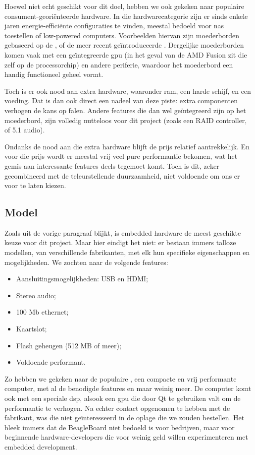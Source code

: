 \documentclass[verslag.tex]{subfiles}
\begin{document}
Hoewel niet echt geschikt voor dit doel, hebben we ook gekeken naar populaire consument-georiënteerde hardware. In die hardwarecategorie zijn er sinds enkele jaren energie-efficiënte configuraties te vinden, meestal bedoeld voor \ac{nas} toestellen of low-powered computers. Voorbeelden hiervan zijn moederborden gebaseerd op de , of de meer recent geïntroduceerde . Dergelijke moederborden komen vaak met een geïntegreerde \ac{gpu} (in het geval van de AMD Fusion zit die zelf op de processorchip) en andere periferie, waardoor het moederbord een handig functioneel geheel vormt.

Toch is er ook nood aan extra hardware, waaronder \ac{ram}, een harde schijf, en een voeding. Dat is dan ook direct een nadeel van deze piste: extra componenten verhogen de kans op falen. Andere features die dan wel geïntegreerd zijn op het moederbord, zijn volledig nutteloos voor dit project (zoals een RAID controller, of 5.1 audio).

Ondanks de nood aan die extra hardware blijft de prijs relatief aantrekkelijk. En voor die prijs wordt er meestal vrij veel pure performantie bekomen, wat het gemis aan interessante features deels tegemoet komt. Toch is dit, zeker gecombineerd met de teleurstellende duurzaamheid, niet voldoende om ons er voor te laten kiezen.

\subsection{Model}

Zoals uit de vorige paragraaf blijkt, is embedded hardware de meest geschikte keuze voor dit project. Maar hier eindigt het niet: er bestaan immers talloze modellen, van verschillende fabrikanten, met elk hun specifieke eigenschappen en mogelijkheden. We zochten naar de volgende features:
\begin{itemize}
\item Aansluitingsmogelijkheden: USB en HDMI;
\item Stereo audio;
\item 100 Mb ethernet;
\item Kaartslot;
\item Flash geheugen (512 MB of meer);
\item Voldoende performant.
\end{itemize}

Zo hebben we gekeken naar de populaire , een compacte en vrij performante computer, met al de benodigde features en maar weinig meer. De computer komt ook met een speciale \ac{dsp}, alsook een \ac{gpu} die door Qt te gebruiken valt om de performantie te verhogen. Na echter contact opgenomen te hebben met de fabrikant, was die niet geïnteresseerd in de oplage die we zouden bestellen. Het bleek immers dat de BeagleBoard niet bedoeld is voor bedrijven, maar voor beginnende hardware-developers die voor weinig geld willen experimenteren met embedded development.
\end{document}
